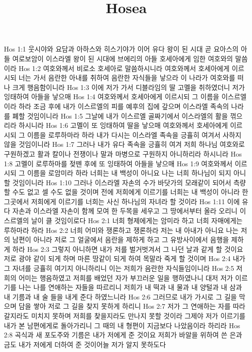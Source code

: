 

\title{Hosea}

Hos 1:1  웃시야와 요담과 아하스와 히스기야가 이어 유다 왕이 된 시대 곧 요아스의 아들 여로보암이 이스라엘 왕이 된 시대에 브에리의 아들 호세아에게 임한 여호와의 말씀이라
Hos 1:2  여호와께서 비로소 호세아로 말씀하시니라 여호와께서 호세아에게 이르시되 너는 가서 음란한 아내를 취하여 음란한 자식들을 낳으라 이 나라가 여호와를 떠나 크게 행음함이니라
Hos 1:3  이에 저가 가서 디블라임의 딸 고멜을 취하였더니 저가 잉태하여 아들을 낳으매
Hos 1:4  여호와께서 호세아에게 이르시되 그 이름을 이스르엘이라 하라 조금 후에 내가 이스르엘의 피를 예후의 집에 갚으며 이스라엘 족속의 나라를 폐할 것임이니라
Hos 1:5  그날에 내가 이스르엘 골짜기에서 이스라엘의 활을 꺾으리라 하시니라
Hos 1:6  고멜이 또 잉태하여 딸을 낳으매 여호와께서 호세아에게 이르시되 그 이름을 로루하마라 하라 내가 다시는 이스라엘 족속을 긍휼히 여겨서 사하지 않을 것임이니라
Hos 1:7  그러나 내가 유다 족속을 긍휼히 여겨 저희 하나님 여호와로 구원하겠고 활과 칼이나 전쟁이나 말과 마병으로 구원하지 아니하리라 하시니라
Hos 1:8  고멜이 로루하마를 젖뗀 후에 또 잉태하여 아들을 낳으매
Hos 1:9  여호와께서 이르시되 그 이름을 로암미라 하라 너희는 내 백성이 아니요 나는 너희 하나님이 되지 아니할 것임이니라
Hos 1:10  그러나 이스라엘 자손의 수가 바닷가의 모래같이 되어서 측량할 수도 없고 셀 수도 없을 것이며 전에 저희에게 이르기를 너희는 내 백성이 아니라 한 그곳에서 저희에게 이르기를 너희는 사신 하나님의 자녀라 할 것이라
Hos 1:11  이에 유다 자손과 이스라엘 자손이 함께 모여 한 두목을 세우고 그 땅에서부터 올라 오리니 이스르엘의 날이 클 것임이로다
Hos 2:1  너희 형제에게는 암미라 하고 너희 자매에게는 루하마라 하라
Hos 2:2  너희 어미와 쟁론하고 쟁론하라 저는 내 아내가 아니요 나는 저의 남편이 아니라 저로 그 얼굴에서 음란을 제하게 하고 그 유방사이에서 음행을 제하게 하라
Hos 2:3  그렇지 아니하면 내가 저를 벌거벗겨서 그 나던 날과 같게 할 것이요 저로 광야 같이 되게 하며 마른 땅같이 되게 하여 목말라 죽게 할 것이며
Hos 2:4  내가 그 자녀를 긍휼히 여기지 아니하리니 이는 저희가 음란한 자식들임이니라
Hos 2:5  저희의 어미는 행음하였고 저희를 배었던 자가 부끄러운 일을 행하였나니 대저 저가 이르기를 나는 나를 연애하는 자들을 따르리니 저희가 내 떡과 내 물과 내 양털과 내 삼과 내 기름과 내 술 들을 내게 준다 하였느니라
Hos 2:6  그러므로 내가 가시로 그 길을 막으며 담을 쌓아 저로 그 길을 찾지 못하게 하리니
Hos 2:7  저가 그 연애하는 자를 따라 갈지라도 미치지 못하며 저희를 찾을지라도 만나지 못할 것이라 그제야 저가 이르기를 내가 본 남편에게로 돌아가리니 그 때의 내 형편이 지금보다 나았음이라 하리라
Hos 2:8  곡식과 새 포도주와 기름은 내가 저에게 준 것이요 저희가 바알을 위하여 쓴 은과 금도 내가 저에게 더하여 준 것이어늘 저가 알지 못하도다
